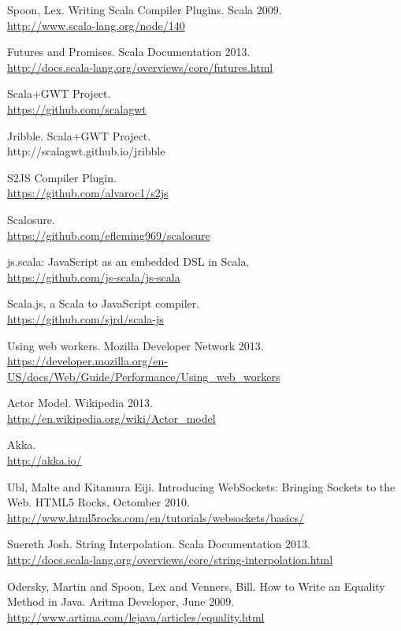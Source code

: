 \begin{thebibliography}{99}
  {\sc Spoon,} Lex. Writing Scala Compiler Plugins. Scala 2009.\\
  \url{http://www.scala-lang.org/node/140}
	
  Futures and Promises. Scala Documentation 2013.\\
  \url{http://docs.scala-lang.org/overviews/core/futures.html}
	
  Scala+GWT Project.\\
  \url{https://github.com/scalagwt}
	
	Jribble. Scala+GWT Project.\\
	http://scalagwt.github.io/jribble
	
  S2JS Compiler Plugin.\\
  \url{https://github.com/alvaroc1/s2js}
	
  Scalosure.\\
  \url{https://github.com/efleming969/scalosure}
	
  js.scala: JavaScript as an embedded DSL in Scala.\\
  \url{https://github.com/js-scala/js-scala}
	
  Scala.js, a Scala to JavaScript compiler.\\
  \url{https://github.com/sjrd/scala-js}
	
  Using web workers. Mozilla Developer Network 2013.\\
  \url{https://developer.mozilla.org/en-US/docs/Web/Guide/Performance/Using\_web\_workers}
	
  Actor Model. Wikipedia 2013.\\
  \url{http://en.wikipedia.org/wiki/Actor\_model}
	
	Akka.\\
	\url{http://akka.io/}
	
  {\sc Ubl}, Malte and {\sc Kitamura} Eiji. Introducing WebSockets: Bringing Sockets to the Web. HTML5 Rocks, Octomber 2010.\\
	\url{http://www.html5rocks.com/en/tutorials/websockets/basics/}
	
	{\sc Suereth} Josh. String Interpolation. Scala Documentation 2013.\\
	\url{http://docs.scala-lang.org/overviews/core/string-interpolation.html}
	
  {\sc Odersky,} Martin and {\sc Spoon,} Lex and {\sc Venners,} Bill. How to Write an Equality Method in Java. Aritma Developer, June 2009.\\
	\url{http://www.artima.com/lejava/articles/equality.html}
	
\end{thebibliography}